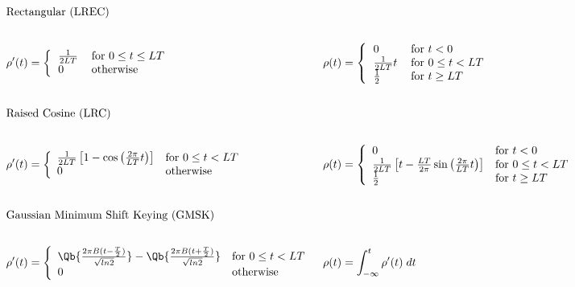 \begin{fsL}
\begin{align*}
   \intertext{Rectangular (LREC)} \\
   \rho'(t) &=
      \left\{ 
         \begin{tabular}{ll}
            $\frac{1}{2LT}$   & for $0\le t \le LT$ \\
            $0$               & otherwise
         \end{tabular}
      \right.
&
   \rho(t) &= 
      \left\{ 
         \begin{tabular}{ll}
            $0$               & for $t<0$ \\
            $\frac{1}{2LT}t$  & for $0\le t< LT$ \\
            $\frac{1}{2}$     & for $t\ge LT$ 
         \end{tabular}
      \right.
\\ \\
   \intertext{Raised Cosine (LRC)} \\
   \rho'(t) &= 
      \left\{ 
         \begin{array}{ll}
            \frac{1}{2LT}\left[ 1 - \cos\left(\frac{2\pi}{LT}t\right) \right]  & \mbox{for } 0\le t< LT \\
            0              & \mbox{otherwise}
         \end{array}
      \right.
&
   \rho(t) &=
      \left\{ 
         \begin{array}{ll}
            0             & \mbox{for } t<0 \\
            \frac{1}{2LT}\left[ t - \frac{LT}{2\pi}\sin\left(\frac{2\pi}{LT}t\right) \right]  & \mbox{for } 0\le t< LT \\
            \frac{1}{2}   & \mbox{for } t\ge LT
         \end{array}
      \right.
\\ \\
   \intertext{Gaussian Minimum Shift Keying (GMSK)} \\
   \rho'(t) &= 
      \left\{ 
         \begin{array}{ll}
            \Qb{\frac{2\pi B(t-\frac{T}{2})}{\sqrt{ln2}}} -   
            \Qb{\frac{2\pi B(t+\frac{T}{2})}{\sqrt{ln2}}}
            & \mbox{for } 0\le t< LT \\
            0              & \mbox{otherwise}
         \end{array}
      \right.
&
   \rho(t) &=
      \int_{-\infty}^t \rho'(t) \; dt
\end{align*}
\end{fsL}










